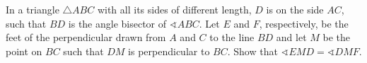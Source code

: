 In a triangle $\triangle{ABC}$ with all its sides of different length, $D$ is on the side $AC$,  such that $BD$ is the angle bisector of $\sphericalangle{ABC}$. Let $E$ and $F$,  respectively, be the feet of the perpendicular drawn from $A$ and $C$ to the line $BD$ and let $M$ be the point on $BC$ such that $DM$ is perpendicular to $BC$. Show that $\sphericalangle{EMD}=\sphericalangle{DMF}$.